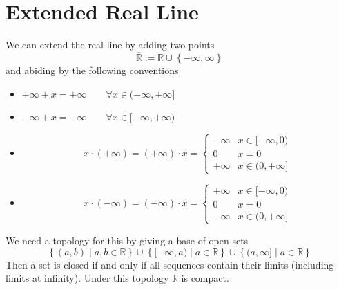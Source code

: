 \documentclass[11pt]{article}
\newcommand{\defeq}{:=}
\newcommand{\relmiddle}[1]{\mathrel{}\middle#1\mathrel{}}
\newcommand{\rmv}{\relmiddle|}
\newcommand{\R}{\mathbb{R}}
\newcommand{\Rb}{\overline{\R}}
\begin{document}
\section{Extended Real Line}
We can extend the real line by adding two points
\[
	\Rb\defeq\R\cup\left\{-\infty, \infty\right\}
\]
and abiding by the following conventions
\begin{itemize}
	\item $+\infty + x = + \infty \quad\quad \forall x\in(-\infty, +\infty]$
	\item $-\infty + x = - \infty \quad\quad \forall x\in[-\infty, +\infty)$
	\item 
		\begin{equation*}	
		x\cdot(+\infty)=(+\infty)\cdot x = 
		\begin{cases}
			-\infty		&	x\in [-\infty, 0)\\
			0			&	x=0\\
			+\infty		&	x\in (0, +\infty]
		\end{cases}
		\end{equation*}
	\item 
		\begin{equation*}	
		x\cdot(-\infty)=(-\infty)\cdot x = 
		\begin{cases}
			+\infty		&	x\in [-\infty, 0)\\
			0			&	x=0\\
			-\infty		&	x\in (0, +\infty]
		\end{cases}
		\end{equation*}
\end{itemize}
We need a topology for this by giving a base of open sets
\[
	\left\{(a, b) \rmv a, b\in\R \right\}\cup\left\{[-\infty, a) \rmv a\in\R\right\}\cup \left\{(a, \infty] \rmv a\in\R\right\}
\]
Then a set is closed if and only if all sequences contain their limits (including limits at infinity).
Under this topology $\Rb$ is compact.
\end{document}
